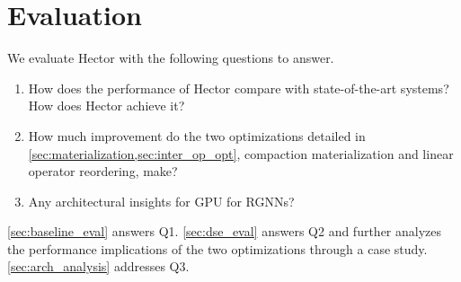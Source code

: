 






\section{Evaluation}
\label{sec:eval}

We evaluate Hector with the following questions to answer.


\begin{enumerate}[Q1.]
\item How does the performance of Hector compare with state-of-the-art systems? How does Hector achieve it?
\item How much improvement do the two optimizations detailed in \cref{sec:materialization,sec:inter_op_opt}, compaction materialization and linear operator reordering, make? 
\item Any architectural insights for GPU for RGNNs?
\end{enumerate}



\cref{sec:baseline_eval} answers Q1. \cref{sec:dse_eval} answers Q2 and further analyzes the performance implications of the two optimizations through a case study. \cref{sec:arch_analysis} addresses Q3.


